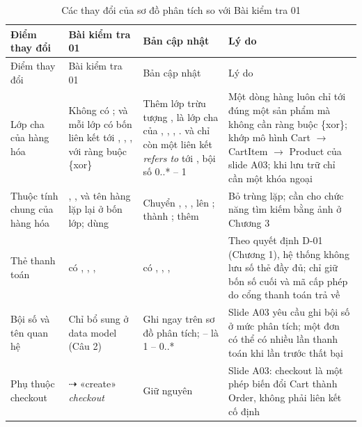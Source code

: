 \documentclass[12pt,a4paper]{article}
\begin{document}
\begin{longtable}{@{}P{2.6cm}P{3.8cm}P{4.4cm}P{4.7cm}@{}}
\caption{Các thay đổi của sơ đồ phân tích so với Bài kiểm tra 01}\label{tab:changes}\\
\toprule
Điểm thay đổi & Bài kiểm tra 01 & Bản cập nhật & Lý do\\
\midrule
\endfirsthead
\toprule
Điểm thay đổi & Bài kiểm tra 01 & Bản cập nhật & Lý do\\
\midrule
\endhead
\small Lớp cha của hàng hóa & \small Không có ;  và  mỗi lớp có bốn liên kết tới , , ,  với ràng buộc \{xor\} &
\small Thêm lớp trừu tượng , là lớp cha của , , , .  và  chỉ còn một liên kết \emph{refers to} tới , bội số 0..* -- 1 &
\small Một dòng hàng luôn chỉ tới đúng một sản phẩm mà không cần ràng buộc \{xor\}; khớp mô hình Cart $\to$ CartItem $\to$ Product của slide A03; khi lưu trữ chỉ cần một khóa ngoại \\
\small Thuộc tính chung của hàng hóa & \small {}, ,  và tên hàng lặp lại ở bốn lớp;  dùng  &
\small Chuyển , , ,  lên ;  thành ; thêm  &
\small Bỏ trùng lặp;  cần cho chức năng tìm kiếm bằng ảnh ở Chương 3\\
\small Thẻ thanh toán & \small {} có , , ,  &
\small {} có , , ,  &
\small Theo quyết định D-01 (Chương 1), hệ thống không lưu số thẻ đầy đủ; chỉ giữ bốn số cuối và mã cấp phép do cổng thanh toán trả về\\
\small Bội số và tên quan hệ & \small Chỉ bổ sung ở data model (Câu 2) &
\small Ghi ngay trên sơ đồ phân tích;  --  là 1 -- 0..* &
\small Slide A03 yêu cầu ghi bội số ở mức phân tích; một đơn có thể có nhiều lần thanh toán khi lần trước thất bại\\
\small Phụ thuộc checkout & \small {} $\dashrightarrow$  «create» \emph{checkout} &
\small Giữ nguyên &
\small Slide A03: checkout là một phép biến đổi Cart thành Order, không phải liên kết cố định\\
\bottomrule
\end{longtable}
\end{document}
